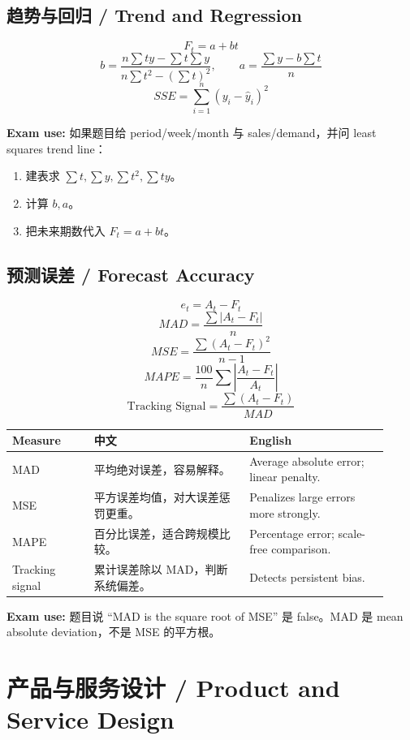 \documentclass[10pt,a4paper]{ctexart}
\newcommand{\exam}[1]{\textcolor{Amber}{\textbf{Exam use:} #1}}
\begin{document}
\subsection{趋势与回归 / Trend and Regression}
\label{subsec:trend}
\[
F_t=a+bt
\]
\[
b=\frac{n\sum ty-\sum t\sum y}{n\sum t^2-(\sum t)^2},
\qquad
a=\frac{\sum y-b\sum t}{n}
\]
\[
SSE=\sum_{i=1}^{n}(y_i-\hat{y}_i)^2
\]

\textcolor{Amber}{\textbf{Exam use:}} 如果题目给 period/week/month 与 sales/demand，并问 least squares trend line：
\begin{enumerate}
  \item 建表求 $\sum t,\sum y,\sum t^2,\sum ty$。
  \item 计算 $b,a$。
  \item 把未来期数代入 $F_t=a+bt$。
\end{enumerate}

\subsection{预测误差 / Forecast Accuracy}
\label{subsec:accuracy}

\[
e_t=A_t-F_t
\]
\[
MAD=\frac{\sum |A_t-F_t|}{n}
\]
\[
MSE=\frac{\sum (A_t-F_t)^2}{n-1}
\]
\[
MAPE=\frac{100}{n}\sum\left|\frac{A_t-F_t}{A_t}\right|
\]
\[
\text{Tracking Signal}=\frac{\sum(A_t-F_t)}{MAD}
\]

\begin{longtable}{@{}L{0.20\linewidth}L{0.38\linewidth}L{0.34\linewidth}@{}}
\toprule
\textbf{Measure} & \textbf{中文} & \textbf{English} \\
\midrule
MAD & 平均绝对误差，容易解释。 & Average absolute error; linear penalty. \\
MSE & 平方误差均值，对大误差惩罚更重。 & Penalizes large errors more strongly. \\
MAPE & 百分比误差，适合跨规模比较。 & Percentage error; scale-free comparison. \\
Tracking signal & 累计误差除以 MAD，判断系统偏差。 & Detects persistent bias. \\
\bottomrule
\end{longtable}

\exam{题目说 ``MAD is the square root of MSE'' 是 false。MAD 是 mean absolute deviation，不是 MSE 的平方根。}

\section{产品与服务设计 / Product and Service Design}
\label{sec:design}
\end{document}
